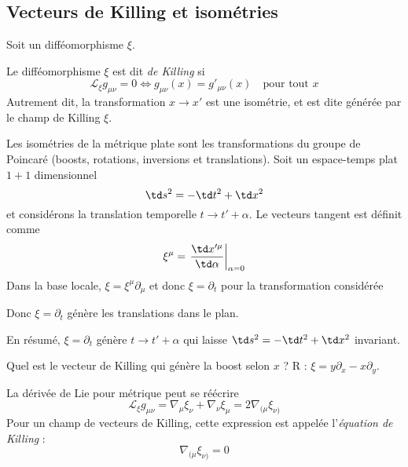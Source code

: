 \subsection{Vecteurs de Killing et isométries}
Soit un difféomorphisme $\xi$.
\begin{theoremframe}
    \begin{defi}
        Le difféomorphisme $\xi$ est dit \emph{de Killing} si 
        \begin{equation}
            \mathcal{L}_{\xi}g_{\mu \nu} = 0 \iff  g_{\mu \nu}(x) = g'_{\mu \nu}(x) \quad \text{pour tout $x$}
        \end{equation}
        Autrement dit, la transformation $x\to x'$ est une isométrie, et est dite générée par le champ de Killing $\xi$.
    \end{defi}
\end{theoremframe}
\begin{exmp}
    Les isométries de la métrique plate sont les transformations du groupe de Poincaré (boosts, rotations, inversions et translations). Soit un espace-temps plat $1+1$ dimensionnel 
    \begin{equation}
        \td s^2 = -\td t^2 + \td x^2
    \end{equation}  
    et considérons la translation temporelle $t \to t' + \alpha$. Le vecteurs tangent est définit comme
    \begin{equation}
        \xi^{\mu} = \left. \frac{\td x'^{\mu}}{\td \alpha}\right|_{\alpha = 0}
    \end{equation}
    Dans la base locale, $\xi = \xi^{\mu}\partial_{\mu}$ et donc  $\xi = \partial_{t}$ pour la transformation considérée

    Donc $\xi = \partial_{t}$ génère les translations dans le plan. 

    En résumé, $\xi = \partial_{t}$ génère  $t \rightarrow t' + \alpha$ qui laisse $\td s^2 = -\td t^2 + \td x^2$ invariant. 
\end{exmp}
\begin{exerc}
    Quel est le vecteur de Killing qui génère la boost selon $x$ ? R : $\xi = y\partial_{x} - x\partial_{y}$.
\end{exerc}

\begin{theoremframe}
    \begin{propri}
        La dérivée de Lie pour métrique peut se réécrire
        \begin{equation}
            \mathcal{L}_{\xi}g_{\mu \nu} = \nabla_{\mu}\xi_{\nu} + \nabla_{\nu}\xi_{\mu} = 2\nabla_{(\mu}\xi_{\nu)}
        \end{equation}
        Pour un champ de vecteurs de Killing, cette expression est appelée l'\emph{équation de Killing} :
        \begin{equation}
            \boxed{\nabla_{(\mu}\xi_{\nu)} = 0}
        \end{equation}
    \end{propri}
\end{theoremframe}

